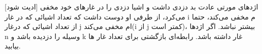[ادیت شود]
\p
    اژدهای مورتی عادت بد دزدی داشت و اشیا دزدی را در غارهای خود مخفی می‌کرد، از طرفی او دوست داشت که تعداد اشیائی که در غار i م مخفی می‌کند، حتما از تعداد اشیائی که درغار j ام مخفی می‌کند(i از j کمتر است)، بیشتر نباشد. اگر اژدها n وسیله را دزدیده باشد و k غار داشته باشد. رابطه‌ای بازگشتی برای تعداد غار ها بیابید.